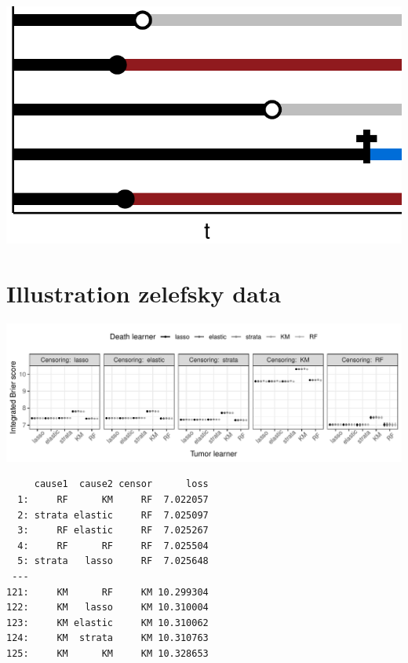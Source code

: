 \documentclass[11pt]{article}
\begin{document}
\begin{center}
\includegraphics[width=.9\linewidth]{./multi-state-data-3.pdf}
\end{center}

\section{Illustration zelefsky data}
\label{sec:orga70ad2a}

\begin{center}
\includegraphics[width=.9\linewidth]{zelefski-real-data.pdf}
\end{center}

\begin{verbatim}
     cause1  cause2 censor      loss
  1:     RF      KM     RF  7.022057
  2: strata elastic     RF  7.025097
  3:     RF elastic     RF  7.025267
  4:     RF      RF     RF  7.025504
  5: strata   lasso     RF  7.025648
 ---                                
121:     KM      RF     KM 10.299304
122:     KM   lasso     KM 10.310004
123:     KM elastic     KM 10.310062
124:     KM  strata     KM 10.310763
125:     KM      KM     KM 10.328653
\end{verbatim}
\end{document}
